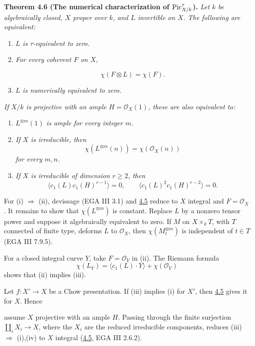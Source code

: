 \textbf{Theorem 4.6 (The numerical characterization of
\(\operatorname{Pic}^\tau_{X/k}\)).} \emph{Let \(k\) be algebraically closed, \(X\)
proper over \(k\), and \(L\) invertible on \(X\). The following are
equivalent:}
\begin{enumerate}[label=(\roman*)]
\item \emph{\(L\) is \(\tau\)-equivalent to zero.}
\item \emph{For every coherent \(F\) on \(X\),}

\[
\chi(F\otimes L)=\chi(F).
\]
\item \emph{\(L\) is numerically equivalent to zero.}
\end{enumerate}
\emph{If \(X/k\) is projective with an ample
\(H=\mathcal O_X(1)\), these are also equivalent to:}
\begin{enumerate}[label=(\roman*),start=4]
\item \emph{\(L^{\otimes m}(1)\) is ample for every integer \(m\).}
\item \emph{If \(X\) is irreducible, then
\[
\chi(L^{\otimes m}(n))=\chi(\mathcal O_X(n))
\]
for every \(m,n\).}
\item \emph{If \(X\) is irreducible of dimension \(r\ge2\), then
\[
\langle c_1(L)c_1(H)^{r-1}\rangle=0,\qquad
\langle c_1(L)^2c_1(H)^{r-2}\rangle=0.
\]}
\end{enumerate}

For (i) \(\Rightarrow\) (ii), devissage (EGA III 3.1) and \hyperlink{sga6.e13.prop.4-5}{4.5} reduce to
\(X\) integral and \(F=\mathcal O_X\). It remains to show that
\(\chi(L^{\otimes m})\) is constant. Replace \(L\) by a nonzero tensor
power and suppose it algebraically equivalent to zero. If \(M\) on
\(X\times_kT\), with \(T\) connected of finite type, deforms \(L\) to
\(\mathcal O_X\), then \(\chi(M_t^{\otimes m})\) is independent of
\(t\in T\) (EGA III 7.9.5).

For a closed integral curve \(Y\), take \(F=\mathcal O_Y\) in (ii).
The Riemann formula
\[
\chi(L_Y)=\langle c_1(L)\cdot Y\rangle+\chi(\mathcal O_Y)
\]
shows that (ii) implies (iii).

Let \(f:X'\to X\) be a Chow presentation. If (iii) implies (i) for
\(X'\), then \hyperlink{sga6.e13.prop.4-5}{4.5} gives it for \(X\). Hence

assume \(X\) projective with an ample \(H\). Passing through the finite
surjection \(\coprod_iX_i\to X\), where the \(X_i\) are the reduced
irreducible components, reduces (iii) \(\Rightarrow\) (i),(iv) to \(X\)
integral (\hyperlink{sga6.e13.prop.4-5}{4.5}, EGA III 2.6.2).

